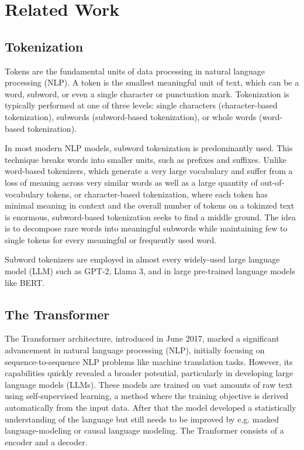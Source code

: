 \chapter{Related Work}

\section{Tokenization}
Tokens are the fundamental units of data processing in natural language processing (NLP). A token is the smallest meaningful unit of text, which can be a word, subword, or even a single character or punctuation mark. Tokenization is typically performed at one of three levels: single characters (character-based tokenization), subwords (subword-based tokenization), or whole words (word-based tokenization).

In most modern NLP models, subword tokenization is predominantly used. This technique breaks words into smaller units, such as prefixes and suffixes. Unlike word-based tokenizers, which generate a very large vocabulary and suffer from a loss of meaning across very similar words as well as a large quantity of out-of-vocabulary tokens, or character-based tokenization, where each token has minimal meaning in context and the overall number of tokens on a tokinzed text is enormous, subword-based tokenization seeks to find a middle ground. The idea is to decompose rare words into meaningful subwords while maintaining few to single tokens for every meaningful or frequently used word.

Subword tokenizers are employed in almost every widely-used large language model (LLM) such as GPT-2, Llama 3, and in large pre-trained language models like BERT.



\section{The Transformer}
The Transformer architecture, introduced in June 2017, marked a significant advancement in natural language processing (NLP), initially focusing on sequence-to-sequence NLP problems like machine translation tasks. However, its capabilities quickly revealed a broader potential, particularly in developing large language models (LLMs). These models are trained on vast amounts of raw text using self-supervised learning, a method where the training objective is derived automatically from the input data. After that the model developed a statistically understanding of the language but still needs to be improved by e.g. masked language-modeling or causal language modeling. The Tranformer consists of a encoder and a decoder.



